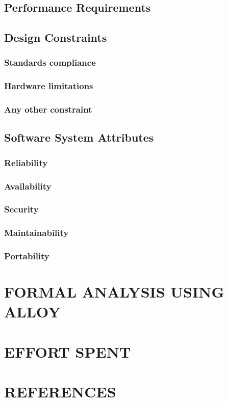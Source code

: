\documentclass{article}
\begin{document}
\subsection{Performance Requirements}



\subsection{Design Constraints}
\subsubsection{Standards compliance}
\subsubsection{Hardware limitations}
\subsubsection{Any other constraint}
\subsection{Software System Attributes}
\subsubsection{Reliability}
\subsubsection{Availability}
\subsubsection{Security}
\subsubsection{Maintainability}
\subsubsection{Portability}

\section{FORMAL ANALYSIS USING ALLOY}

\section{EFFORT SPENT}

\section{REFERENCES}
\end{document}
